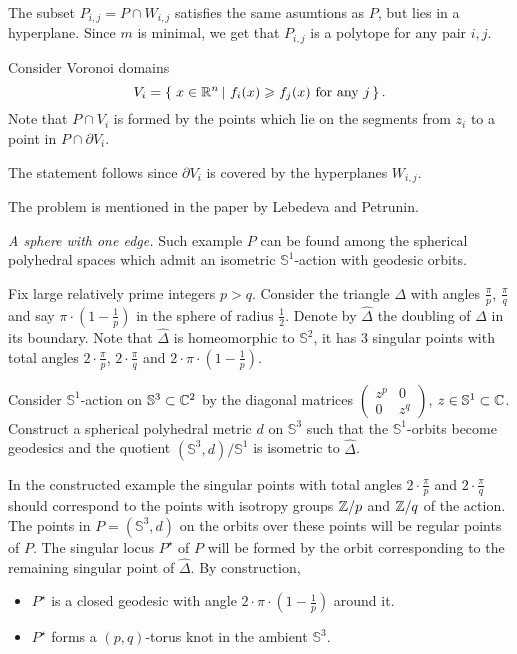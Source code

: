 The subset $P_{i,j}=P\cap W_{i,j}$ satisfies the same asumtions as $P$, but lies in a hyperplane.
Since $m$ is minimal, we get that $P_{i,j}$ is a polytope for any pair $i,j$.

Consider Voronoi domains 
\[V_{i}=\set{x\in\RR^n}{f_i(x)\ge f_j(x) \ \text{for any}\ j}.\]
Note that $P\cap V_i$ is formed by the points which lie on the segments from $z_i$ to a point in  $P\cap \partial V_i$.

The statement follows since $\partial V_i$ is covered by the hyperplanes $W_{i,j}$.

The problem is mentioned in the paper \cite{lebedeva-petrunin} by Lebedeva and Petrunin.



\textit{A sphere with one edge.}
Such example $P$ can be found among the spherical polyhedral spaces which admit
an isometric $\mathbb{S}^1$-action with geodesic orbits.

Fix large relatively prime integers $p>q$. 
Consider the triangle $\Delta$ with angles $\tfrac\pi p$, $\tfrac\pi q$ and say $\pi\cdot(1-\tfrac1 p)$ in the sphere of radius $\tfrac12$.
Denote by $\hat \Delta$ the  doubling of $\Delta$ in its boundary.
Note that $\hat \Delta$ is homeomorphic to $\mathbb S^2$,
it has 3 singular points with total angles $2\cdot\tfrac\pi p$,
$2\cdot\tfrac\pi q$ and $2\cdot\pi\cdot(1-\tfrac1 p)$.

Consider $\mathbb S^1$-action on $\mathbb S^3\subset\mathbb{C}^2$ by the diagonal matrices $\left(\begin{smallmatrix}z^p&0\\0&z^q\end{smallmatrix}\right)$, $z\in\mathbb S^1\subset\mathbb{C}$.
Construct a spherical polyhedral metric $d$ on  $\mathbb S^3$
such that the $\mathbb S^1$-orbits become geodesics 
and the quotient $(\mathbb S^3,d)/\mathbb S^1$
is isometric to $\hat \Delta$.

In the constructed example 
the singular points with total angles $2\cdot\tfrac\pi p$ and
$2\cdot\tfrac\pi q$
should correspond to the points with isotropy groups $\mathbb{Z}/p$ and $\mathbb{Z}/q$ of the action.
The points in $P=(\mathbb{S}^3,d)$ on the orbits over these points will be regular points of $P$.
The singular locus $P^\star$
of $P$ will be formed by the orbit corresponding to the remaining singular point of  $\hat \Delta$.
By construction,
\begin{itemize}
\item $P^\star$ is a closed geodesic with angle $2\cdot\pi\cdot(1-\tfrac1p)$ around it.
\item $P^\star$ forms a $(p,q)$-torus knot in the ambient $\mathbb{S}^3$.
\end{itemize}


